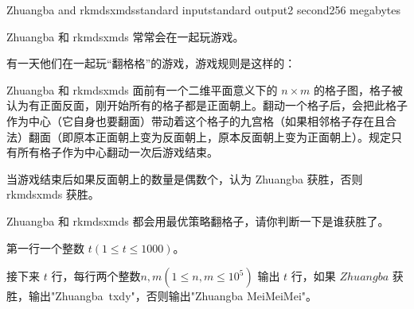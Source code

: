 \begin{problem}{Zhuangba and rkmdsxmds}{standard input}{standard output}{2 second}{256 megabytes}


Zhuangba 和 rkmdsxmds 常常会在一起玩游戏。

有一天他们在一起玩“翻格格”的游戏，游戏规则是这样的：

Zhuangba 和 rkmdsxmds 面前有一个二维平面意义下的 $n\times m$ 的格子图，格子被认为有正面反面，刚开始所有的格子都是正面朝上。翻动一个格子后，会把此格子作为中心（它自身也要翻面）带动着这个格子的九宫格（如果相邻格子存在且合法）翻面（即原本正面朝上变为反面朝上，原本反面朝上变为正面朝上）。规定只有所有格子作为中心翻动一次后游戏结束。

当游戏结束后如果反面朝上的数量是偶数个，认为 Zhuangba 获胜，否则 rkmdsxmds 获胜。

Zhuangba 和 rkmdsxmds 都会用最优策略翻格子，请你判断一下是谁获胜了。
\InputFile


第一行一个整数 $t 
(1\le t \le 1000)$。

接下来 $t$ 行，每行两个整数$n , m (1\le n , m \le 10^5)$
\OutputFile
输出 $t$ 行，如果 $Zhuangba$ 获胜，输出"Zhuangba\ txdy"，否则输出"Zhuangba MeiMeiMei"。

\Example

\begin{example}
%
\end{example}




\end{problem}
